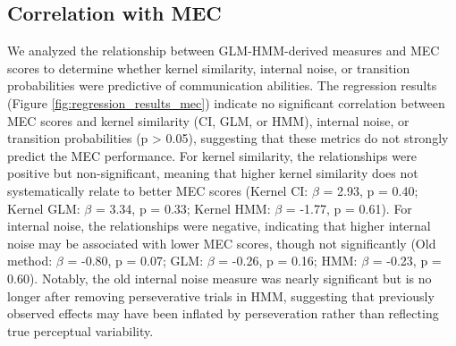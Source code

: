 \subsection {Correlation with MEC} 
We analyzed the relationship between GLM-HMM-derived measures and MEC scores to determine whether kernel similarity, internal noise, or transition probabilities were predictive of communication abilities. The regression results (Figure \ref{fig:regression_results_mec}) indicate no significant correlation between MEC scores and kernel similarity (CI, GLM, or HMM), internal noise, or transition probabilities (p > 0.05), suggesting that these metrics do not strongly predict the MEC performance.  
For kernel similarity, the relationships were positive but non-significant, meaning that higher kernel similarity does not systematically relate to better MEC scores (Kernel CI: $\beta$ = 2.93, p = 0.40; Kernel GLM: $\beta$ = 3.34, p = 0.33; Kernel HMM: $\beta$ = -1.77, p = 0.61). For internal noise, the relationships were negative, indicating that higher internal noise may be associated with lower MEC scores, though not significantly (Old method: $\beta$ = -0.80, p = 0.07; GLM: $\beta$ = -0.26, p = 0.16; HMM: $\beta$ = -0.23, p = 0.60). Notably, the old internal noise measure was nearly significant but is no longer after removing perseverative trials in HMM, suggesting that previously observed effects may have been inflated by perseveration rather than reflecting true perceptual variability.

